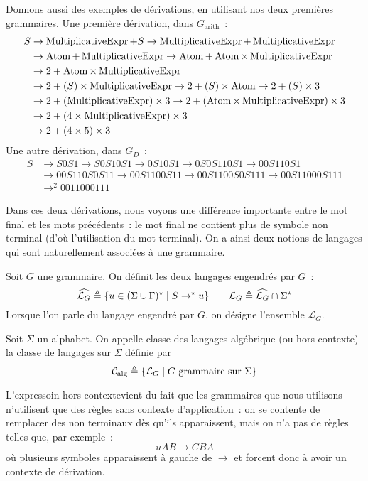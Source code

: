 Donnons aussi des exemples de dérivations, en utilisant nos deux premières
grammaires. Une première dérivation, dans $G_{\mathrm{arith}}$~:
\begin{align*}
  S &\to \operatorname{MultiplicativeExpr} + S \to \operatorname{MultiplicativeExpr} + \operatorname{MultiplicativeExpr} \\
  &\to \operatorname{Atom} + \operatorname{MultiplicativeExpr} \to \operatorname{Atom} + \operatorname{Atom} \times \operatorname{MultiplicativeExpr} \\
  &\to 2 + \operatorname{Atom}\times \operatorname{MultiplicativeExpr} \\
  &\to 2 + (S)\times \operatorname{MultiplicativeExpr} \to 2 + (S) \times \operatorname{Atom} \to 2 + (S) \times 3\\
  &\to 2 + (\operatorname{MultiplicativeExpr}) \times 3 \to 2 + (\operatorname{Atom} \times \operatorname{MultiplicativeExpr}) \times 3\\
  &\to 2 + (4 \times \operatorname{MultiplicativeExpr}) \times 3\\
  &\to 2 + (4 \times 5) \times 3
\end{align*}
Une autre dérivation, dans $G_D$~:
\begin{align*}
  S &\to S0S1 \to S0S10S1 \to 0S10S1\to 0S0S110S1 \to 00S110S1 \\
  &\to 00S110S0S11 \to 00S1100S11 \to 00S1100S0S111\to 00S11000S111\\
  &\to^2 0011000111
\end{align*}

Dans ces deux dérivations, nous voyons une différence importante entre le mot
final et les mots précédents~: le mot final ne contient plus de symbole non
terminal (d'où l'utilisation du mot \og terminal\fg). On a ainsi deux notions de
langages qui sont naturellement associées à une grammaire.

\begin{definition}
  Soit $G$ une grammaire. On définit les deux langages engendrés par $G$~:
  \[\widehat{\mathcal L_G}\triangleq \{u \in (\Sigma\cup\Gamma)^\star\mid
  S\to^\star u\}
  \qquad \mathcal L_G \triangleq \widehat{\mathcal L_G}\cap \Sigma^\star\]
  Lorsque l'on parle du langage engendré par $G$, on désigne l'ensemble
  $\mathcal L_G$.
\end{definition}

\begin{definition}
  Soit $\Sigma$ un alphabet. On appelle classe des langages algébrique (ou hors
  contexte) la classe de langages sur $\Sigma$ définie par
  \[\mathcal C_{\mathrm{alg}}\triangleq \{\mathcal L_G\mid
  G \text{ grammaire sur }\Sigma\}\]
\end{definition}

\begin{remark}
  L'expressoin \og hors contexte\fg vient du fait que les grammaires que nous
  utilisons n'utilisent que des règles sans contexte d'application~: on se
  contente de remplacer des non terminaux dès qu'ils apparaissent, mais on n'a
  pas de règles telles que, par exemple~:
  \[uAB \to CBA\]
  où plusieurs symboles apparaissent à gauche de $\to$ et forcent donc à avoir
  un contexte de dérivation.
\end{remark}

